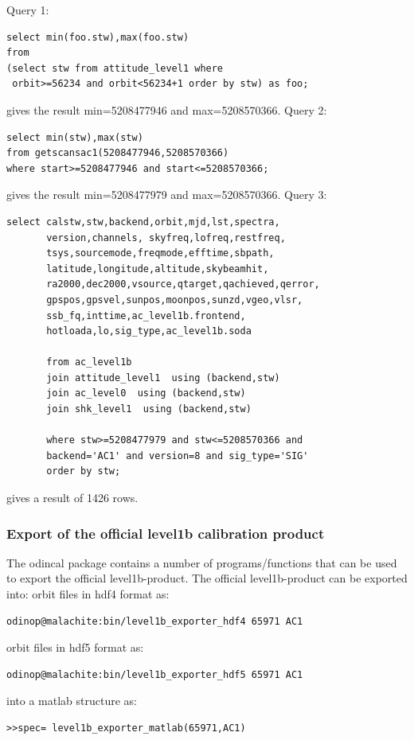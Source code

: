 \documentclass[12pt]{article}
\begin{document}
Query 1:
\begin{verbatim}
select min(foo.stw),max(foo.stw) 
from
(select stw from attitude_level1 where
 orbit>=56234 and orbit<56234+1 order by stw) as foo;
\end{verbatim}
gives the result min=5208477946 and max=5208570366.\newline
Query 2:
\begin{verbatim}
select min(stw),max(stw) 
from getscansac1(5208477946,5208570366) 
where start>=5208477946 and start<=5208570366;
\end{verbatim}
gives the result min=5208477979 and max=5208570366.\newline
Query 3:
\begin{verbatim} 
select calstw,stw,backend,orbit,mjd,lst,spectra,
       version,channels, skyfreq,lofreq,restfreq,
       tsys,sourcemode,freqmode,efftime,sbpath,
       latitude,longitude,altitude,skybeamhit,  
       ra2000,dec2000,vsource,qtarget,qachieved,qerror,
       gpspos,gpsvel,sunpos,moonpos,sunzd,vgeo,vlsr,
       ssb_fq,inttime,ac_level1b.frontend,
       hotloada,lo,sig_type,ac_level1b.soda

       from ac_level1b
       join attitude_level1  using (backend,stw)
       join ac_level0  using (backend,stw)
       join shk_level1  using (backend,stw)
       
       where stw>=5208477979 and stw<=5208570366 and 
       backend='AC1' and version=8 and sig_type='SIG'
       order by stw;

\end{verbatim}
gives a result of 1426 rows. 

\subsubsection{Export of the official level1b calibration product} 
\label{sec:officialexport}
The odincal package contains a number of programs/functions 
that can be used to export the official level1b-product.
The official level1b-product can be exported into:\newline
orbit files in hdf4 format as: 
\begin{verbatim}
odinop@malachite:bin/level1b_exporter_hdf4 65971 AC1 
\end{verbatim}
orbit files in hdf5 format as: 
\begin{verbatim}
odinop@malachite:bin/level1b_exporter_hdf5 65971 AC1 
\end{verbatim}
into a matlab structure as:
\begin{verbatim}
>>spec= level1b_exporter_matlab(65971,AC1)
\end{verbatim}
\end{document}
